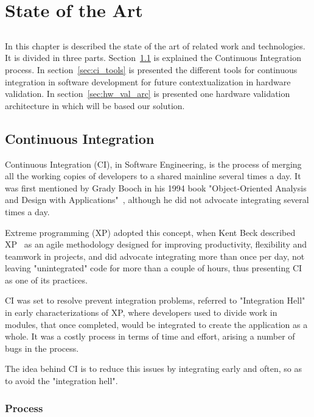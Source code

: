 \chapter{State of the Art} \label{chap:sota}

\section*{}

In this chapter is described the state of the art of related work and technologies. It is divided in three parts. Section~\ref{sec:ci} is explained the Continuous Integration process. In section~\ref{sec:ci_tools} is presented the different tools for continuous integration in software development for future contextualization in hardware validation. In section~\ref{sec:hw_val_arc} is presented one hardware validation architecture in which will be based our solution.

\section{Continuous Integration}\label{sec:ci}

Continuous Integration (CI), in Software Engineering, is the process of merging all the working copies of developers to a shared mainline several times a day.
It was first mentioned by Grady Booch in his 1994 book "Object-Oriented Analysis and Design with Applications"~\cite{GradyBooch}, although he did not advocate integrating several times a day. 

Extreme programming (XP) adopted this concept, when Kent Beck described XP~\cite{KentBeck} as an agile methodology designed for improving productivity, flexibility and teamwork in projects, and did advocate integrating more than once per day, not leaving "unintegrated" code for more than a couple of hours, thus presenting CI as one of its practices.

CI was set to resolve prevent integration problems, referred to "Integration Hell" in early characterizations of XP, where developers used to divide work in modules, that once completed, would be integrated to create the application as a whole. It was a costly process in terms of time and effort, arising a number of bugs in the process.

The idea behind CI is to reduce this issues by integrating early and often, so as to avoid the "integration hell".

\subsection{Process}

